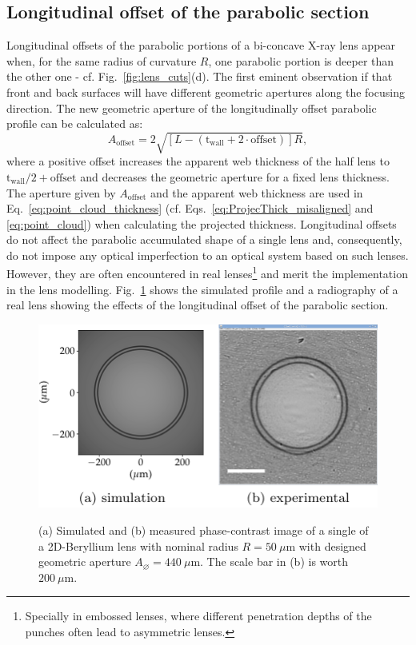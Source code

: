 \begin{refsection}
\subsection{Longitudinal offset of the parabolic section}
Longitudinal offsets of the parabolic portions of a bi-concave X-ray lens appear when, for the same radius of curvature $R$, one parabolic portion is deeper than the other one - cf. Fig.~\ref{fig:lens_cuts}(d). The first eminent observation if that front and back surfaces will have different geometric apertures along the focusing direction. The new geometric aperture of the longitudinally offset parabolic profile can be calculated as:
\begin{equation}\label{eq:A_2}
    A_{\text{offset}} = 2\sqrt{[L-(\text{t}_\text{wall}+2\cdot\text{offset})]R},
\end{equation}{}
where a positive offset increases the apparent web thickness of the half lens to $\text{t}_\text{wall}/2+\text{offset}$ and decreases the geometric aperture for a fixed lens thickness. The aperture given by $ A_{\text{offset}}$ and the apparent web thickness are used in Eq.~\ref{eq:point_cloud_thickness} (cf. Eqs.~\ref{eq:ProjecThick_misaligned} and \ref{eq:point_cloud}) when calculating the projected thickness.
Longitudinal offsets do not affect the parabolic accumulated shape of a single lens and, consequently, do not impose any optical imperfection to an optical system based on such lenses. However, they are often encountered in real lenses\footnote{Specially in embossed lenses, where different penetration depths of the punches often lead to asymmetric lenses.} and merit the implementation in the lens modelling. Fig.~\ref{fig:longitudinal_offset} shows the simulated profile and a radiography of a real lens showing the effects of the longitudinal offset of the parabolic section.

\begin{figure}[t]
        \centering
        {\includegraphics[height=3.cm]{figures/ch04/longitudinal_offset.pdf}}
        \caption[Effects of the longitudinal offset of the parabolic section]{(a) Simulated and (b) measured phase-contrast image of a single of a 2D-Beryllium lens with nominal radius $R=50~\mu\text{m}$ with designed geometric aperture $A_{\diameter}=440~\mu\text{m}$. The scale bar in (b) is worth $200~\mu$m.} \label{fig:longitudinal_offset}
\end{figure}


\end{refsection}
